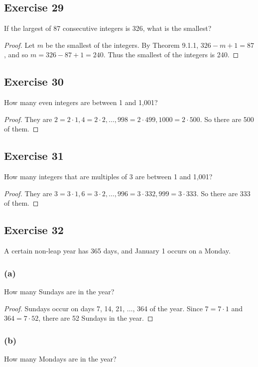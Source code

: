 \documentclass[14pt]{extarticle}
\begin{document}
\subsection{Exercise 29}
If the largest of 87 consecutive integers is 326, what is the smallest?

\begin{proof}
     Let $m$ be the smallest of the integers. By Theorem 9.1.1, \(326 - m + 1 = 87\), and so \(m = 326 - 87 + 1 = 240\).
     Thus the smallest of the integers is 240.
\end{proof}

\subsection{Exercise 30}
How many even integers are between 1 and 1,001?

\begin{proof}
     They are \(2 = 2 \cdot 1, 4 = 2 \cdot 2, \ldots, 998 = 2 \cdot 499, 1000 = 2 \cdot 500\). So there are 500 of them.
\end{proof}

\subsection{Exercise 31}
How many integers that are multiples of 3 are between 1 and 1,001?

\begin{proof}
     They are \(3 = 3 \cdot 1, 6 = 3 \cdot 2, \ldots, 996 = 3 \cdot 332, 999 = 3 \cdot 333\). So there are 333 of them.
\end{proof}

\subsection{Exercise 32}
A certain non-leap year has 365 days, and January 1 occurs on a Monday.

\subsubsection{(a)}
How many Sundays are in the year?

\begin{proof}
     Sundays occur on days 7, 14, 21, \(\ldots\), 364 of the year. Since \(7 = 7 \cdot 1\) and \(364 = 7 \cdot 52\),
     there are 52 Sundays in the year.
\end{proof}

\subsubsection{(b)}
How many Mondays are in the year?
\end{document}
